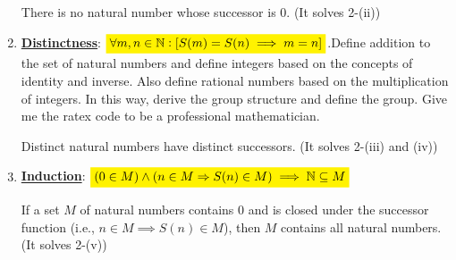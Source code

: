 \begin{enumerate}[\bf 1.]
	There is no natural number whose successor is \(0\). (It solves 2-(ii))
	\vspace{12pt}
	\item \textbf{\underline{Distinctness}}: \(\mathcolorbox{yellow}{\forall m,n\in\N:[S(m)=S(n)\implies m=n]}\).Define addition to the set of natural numbers and define integers based on the concepts of identity and inverse. Also define rational numbers based on the multiplication of integers. In this way, derive the group structure and define the group. Give me the ratex code to be a professional mathematician.
	
	Distinct natural numbers have distinct successors. (It solves 2-(iii) and (iv))
	\vspace{12pt}
	\item \textbf{\underline{Induction}}: \(\mathcolorbox{yellow}{(0 \in M)\land(n \in M\Rightarrow S(n) \in M)\implies\N\subseteq M}\)
	
	If a set \(M\) of natural numbers contains \(0\) and is closed under the successor function (i.e., \(n \in M \implies S(n) \in M\)), then \(M\) contains all natural numbers. (It solves 2-(v))
\end{enumerate}

